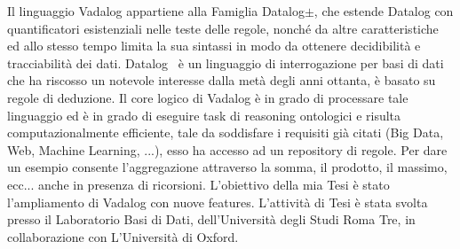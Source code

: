 Il linguaggio Vadalog appartiene alla Famiglia Datalog$\pm $, che estende Datalog con quantificatori esistenziali nelle teste delle regole, nonché da altre caratteristiche ed allo stesso tempo limita la sua sintassi in modo da ottenere decidibilità e tracciabilità dei dati.\newline
Datalog~\cite{WIKI:DATALOG} è un linguaggio di interrogazione per basi di dati che ha riscosso un notevole interesse dalla metà degli anni ottanta, è basato su regole di deduzione. \newline
Il core logico di Vadalog è in grado di processare tale linguaggio ed è in grado di eseguire task di reasoning ontologici e risulta computazionalmente efficiente, tale da soddisfare i requisiti già citati (Big Data, Web, Machine Learning, ...), esso ha accesso ad un repository di regole. Per dare un esempio consente l'aggregazione attraverso la somma, il prodotto, il massimo, ecc... anche in presenza di ricorsioni.\newline \newline
L'obiettivo della mia Tesi è stato l'ampliamento di Vadalog con nuove features. \newline \newline
L'attività di Tesi è stata svolta presso il Laboratorio Basi di Dati, dell'Università degli Studi Roma Tre, in collaborazione con L'Università di Oxford.
